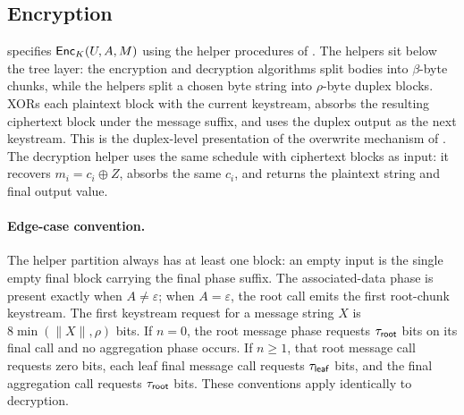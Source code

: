 \subsection{Encryption}
\label{sec:enc}

 specifies $\mathsf{Enc}_K(U, A, M)$ using the helper procedures of
. The helpers sit below the tree layer: the encryption and
decryption algorithms split bodies into $\beta$-byte chunks, while the helpers
split a chosen byte string into $\rho$-byte duplex blocks. 
XORs each plaintext block with the current keystream, absorbs the resulting
ciphertext block under the message suffix, and uses the duplex output as the
next keystream. This is the duplex-level presentation of the overwrite
mechanism of \cite[\S6.2 and Algorithm~5]{BDPV11}. The decryption helper
 uses the same schedule with ciphertext blocks as input:
it recovers $m_i = c_i \oplus Z$, absorbs the same $c_i$, and returns the
plaintext string and final output value.

\paragraph{Edge-case convention.}
The helper partition always has at least one block: an empty input is the single
empty final block carrying the final phase suffix. The associated-data phase is
present exactly when $A \neq \varepsilon$; when $A = \varepsilon$, the root
\siginit call emits the first root-chunk keystream. The first keystream request
for a message string $X$ is $8\min(\|X\|, \rho)$ bits. If $n = 0$, the root
message phase requests $\tau_{\mathsf{root}}$ bits on its final \sigmsglast call and no
aggregation phase occurs. If $n \geq 1$, that root message call requests zero
bits, each leaf final message call requests $\tau_{\mathsf{leaf}}$ bits, and the final
\sigagglast aggregation call requests $\tau_{\mathsf{root}}$ bits. These conventions apply
identically to decryption.

